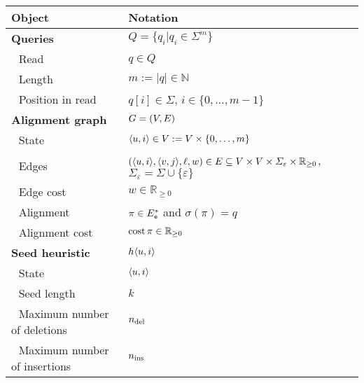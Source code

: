 \begin{table}[!h]
	\centering
	\begin{tabular}{ll}
	\hline
	\textbf{Object}	         & \textbf{Notation}\\
	\hline
	\textbf{Queries}  & $Q = \{ q_i \vert q_i \in \Sigma^m \}$ \\
	\,\, Read            & $q \in Q$ \\
	\,\, Length     & $m := \lvert q \rvert\in \mathbb{N}$\\
	\,\, Position in read & $q[i] \in \Sigma$, $i \in \{0,\dots,m-1\}$\\	
	\hline
	\textbf{Alignment graph}& $G=(V,E)$\\
	\,\, State& $\langle u,i \rangle \in V := V \times \{0,\dots,m\}$\\
	\,\, Edges& $(\langle u,i \rangle, \langle v,j \rangle,\ell,w) \in E
	\subseteq V \times V \times \Sigma_{\varepsilon} \times
	\mathbb{R}_{\geq 0}$, $\Sigma_{\varepsilon} = \Sigma \cup \{\varepsilon\}$\\
	\,\, Edge cost& $w \in \mathbb{R}_{\geq 0}$\\
	\,\, Alignment& $\pi \in E_\texttt{e}^*$ and $\sigma(\pi)=q$ \\
	\,\, Alignment cost& $\operatorname{cost}{\pi} \in \mathbb{R}_{\geq 0}$\\
	\hline
	\textbf{Seed heuristic}& $h\langle u, i \rangle$\\
	\,\, State& $\langle u, i \rangle$\\
	\,\, Seed length& $k$\\
	\,\, Maximum number of deletions& $n_\text{del}$\\
	\,\, Maximum number of insertions& $n_\text{ins}$\\

\end{tabular}
\end{table}
